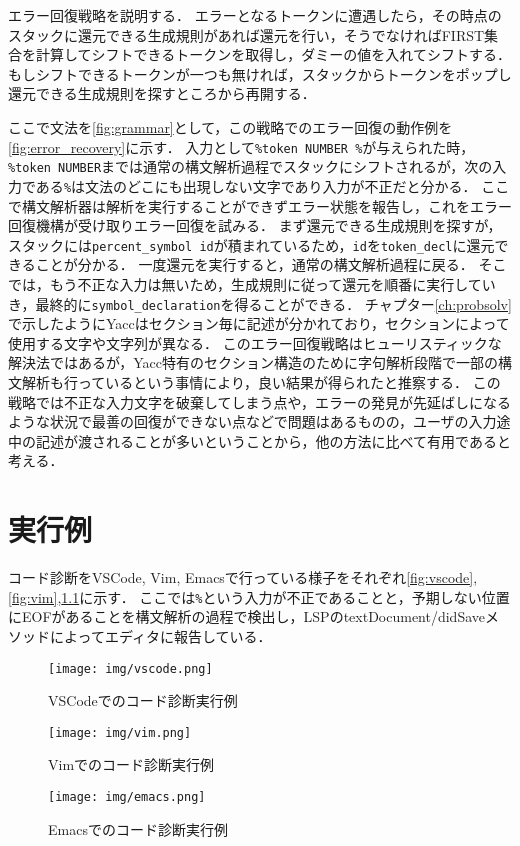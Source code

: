 \documentclass[fontsize=9bp,twocolumn,column_gap=2.36zw,a4paper,report]{jlreq}
\begin{document}
エラー回復戦略を説明する．
エラーとなるトークンに遭遇したら，その時点のスタックに還元できる生成規則があれば還元を行い，そうでなければFIRST集合を計算してシフトできるトークンを取得し，ダミーの値を入れてシフトする．
もしシフトできるトークンが一つも無ければ，スタックからトークンをポップし還元できる生成規則を探すところから再開する．\par
ここで文法を\ref{fig:grammar}として，この戦略でのエラー回復の動作例を\ref{fig:error_recovery}に示す．
入力として\texttt{\%token NUMBER \%}が与えられた時，\texttt{\%token NUMBER}までは通常の構文解析過程でスタックにシフトされるが，次の入力である\texttt{\%}は文法のどこにも出現しない文字であり入力が不正だと分かる．
ここで構文解析器は解析を実行することができずエラー状態を報告し，これをエラー回復機構が受け取りエラー回復を試みる．
まず還元できる生成規則を探すが，スタックには\texttt{percent\_symbol id}が積まれているため，\texttt{id}を\texttt{token\_decl}に還元できることが分かる．
一度還元を実行すると，通常の構文解析過程に戻る．
そこでは，もう不正な入力は無いため，生成規則に従って還元を順番に実行していき，最終的に\texttt{symbol\_declaration}を得ることができる．
チャプター\ref{ch:probsolv}で示したようにYaccはセクション毎に記述が分かれており，セクションによって使用する文字や文字列が異なる．
このエラー回復戦略はヒューリスティックな解決法ではあるが，Yacc特有のセクション構造のために字句解析段階で一部の構文解析も行っているという事情により，良い結果が得られたと推察する．
この戦略では不正な入力文字を破棄してしまう点や，エラーの発見が先延ばしになるような状況で最善の回復ができない点などで問題はあるものの，ユーザの入力途中の記述が渡されることが多いということから，他の方法に比べて有用であると考える．
\newline

\chapter{実行例}

コード診断をVSCode, Vim, Emacsで行っている様子をそれぞれ\ref{fig:vscode},\ref{fig:vim},\ref{fig:emacs}に示す．
ここでは\texttt{\%}という入力が不正であることと，予期しない位置にEOFがあることを構文解析の過程で検出し，LSPのtextDocument/didSaveメソッドによってエディタに報告している．

\begin{figure}[h]
\begin{minipage}[h]{1.0\linewidth}
	\centering
	\texttt{[image: img/vscode.png]}
	\caption{VSCodeでのコード診断実行例}\label{fig:vscode}
	\vspace{1.0\baselineskip}
\end{minipage}
\begin{minipage}[h]{1.0\linewidth}
	\centering
	\texttt{[image: img/vim.png]}
	\caption{Vimでのコード診断実行例}\label{fig:vim}
	\vspace{1.0\baselineskip}
\end{minipage}
\begin{minipage}[h]{1.0\linewidth}
	\centering
	\texttt{[image: img/emacs.png]}
	\caption{Emacsでのコード診断実行例}\label{fig:emacs}
\end{minipage}
\end{figure}
\end{document}
